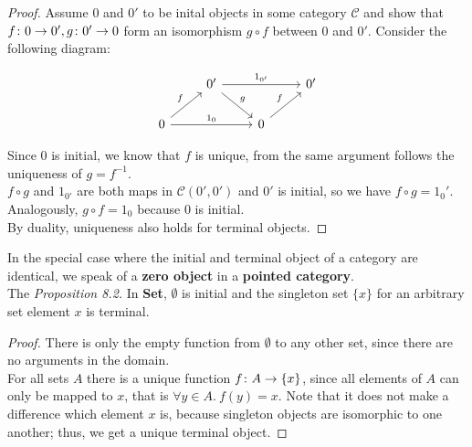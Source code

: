 \begin{proof}
Assume $0$ and $0'$ to be inital objects in some category $\mathscr{C}$ and show that
$f \from 0 \to 0', g \from 0' \to 0$ form an isomorphism
$g \circ f$ between $0$ and $0'$. Consider the following diagram:

\[
\begin{tikzcd}
  & 0' \arrow{dr}{g} \arrow{rr}{1_{0'}}    &&  0'\\
  0 \arrow{ur}{f} \arrow{rr}{1_0} && 0 \arrow{ur}{f}
\end{tikzcd}
\]

Since $0$ is initial, we know that $f$ is unique, from the same argument follows the uniqueness of $g = f^{-1}$. \\$f \circ g$ and $1_{0'}$ are both maps in $\mathscr{C}(0', 0')$ and $0'$ is initial, so we have $f \circ g = 1_0'$. Analogously, $g \circ f = 1_0$ because $0$ is initial. \\
By duality, uniqueness also holds for terminal objects. 
\end{proof}
In the special case where the initial and terminal object of a category are identical, we speak of a \textbf{zero object} in a \textbf{pointed category}.\\
The 
\textit{Proposition 8.2.} In \textbf{Set}, $\emptyset$ is initial and the singleton set $\{x\}$ for an arbitrary set element $x$ is terminal.
\begin{proof}
There is only the empty function from $\emptyset$ to any other set, since there are no arguments in the domain.
\\For all sets $A$ there is a unique function $f \from A \to \{x\}$, since all elements of $A$ can only be mapped
  to $x$, that is $\forall y \in A.\ f(y) = x$. Note that it does not make a difference which element $x$ is, because singleton objects are isomorphic to one another; thus, we get a unique terminal object.
\end{proof}
